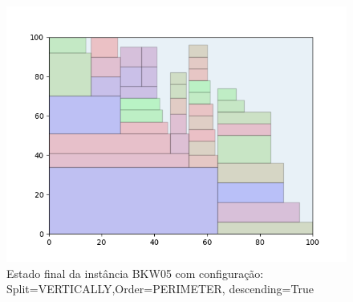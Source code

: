 \begin{figure}[H]
    \centering
    \caption[]{Estado final da instância BKW05 com configuração: Split=VERTICALLY,Order=PERIMETER, descending=True}
    \label{fig:bkw05-vertically-perimeter-true}
    \includegraphics[scale=0.5]{output/figures/bkw/bkw05/vertically/perimeter/true/00}
\end{figure}